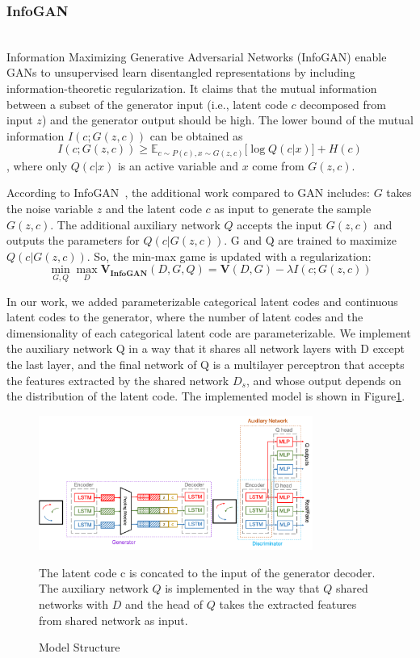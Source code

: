 \subsubsection{InfoGAN}
\hfill \\
Information Maximizing Generative Adversarial Networks (InfoGAN) enable GANs to unsupervised learn disentangled representations by including information-theoretic regularization. It claims that the mutual information between a subset of the generator input (i.e., latent code $c$ decomposed from input $z$) and the generator output should be high. The lower bound of the mutual information $I(c; G(z, c))$ can be obtained as $$I(c; G(z, c)) \geq \mathbb{E}_{c \sim P(c), x \sim G(z, c)} \lbrack \log Q(c | x) \rbrack + H(c)$$, where only $Q(c | x)$ is an active variable and $x$ come from $G(z, c)$.

According to InfoGAN~\cite{infogan}, the additional work compared to GAN includes: $G$ takes the noise variable $z$ and the latent code $c$ as input to generate the sample $G(z, c)$. The additional auxiliary network $Q$ accepts the input $G(z, c)$ and outputs the parameters for $Q(c|G(z, c))$. G and Q are trained to maximize $Q(c | G(z, c))$. So, the min-max game is updated with a regularization: \[\min_{G,Q}\max_{D} \mathbf{V_{InfoGAN}}(D, G, Q) = \mathbf{V}(D, G) - \lambda I(c; G(z, c)) \]

In our work, we added parameterizable categorical latent codes and continuous latent codes to the generator, where the number of latent codes and the dimensionality of each categorical latent code are parameterizable. We implement the auxiliary network Q in a way that it shares all network layers with D except the last layer, and the final network of Q is a multilayer perceptron that accepts the features extracted by the shared network $D_s$, and whose output depends on the distribution of the latent code. The implemented model is shown in Figure\ref{arch}.

\begin{figure}[ht]
  \centering
  \includegraphics[width=0.8\textwidth]{figures/arch.png}
  \caption{Model Structure}{The latent code c is concated to the input of the generator decoder. The auxiliary network $Q$ is implemented in the way that $Q$ shared networks with $D$ and the head of $Q$ takes the extracted features from shared network as input.}
  \label{arch}
\end{figure}

